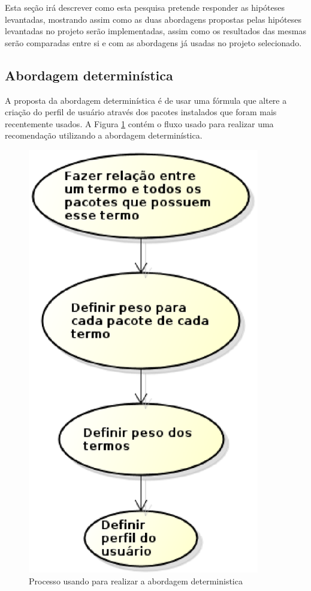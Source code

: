 Esta seção irá descrever como esta pesquisa pretende responder as hipóteses
levantadas, mostrando assim como as duas abordagens propostas pelas hipóteses
levantadas no projeto serão implementadas, assim como os resultados das mesmas
serão comparadas entre si e com as abordagens já usadas no projeto selecionado.

\subsection{Abordagem determinística}

A proposta da abordagem determinística é de usar uma fórmula que altere
a criação do perfil de usuário através dos pacotes instalados que foram mais
recentemente usados. A Figura \ref{fig:abordagem_deterministica}
contém o fluxo usado para realizar uma
recomendação utilizando a abordagem determinística.

\begin{figure}[h]
  \centering
  \includegraphics[width=0.9\textwidth]{figuras/abordagem_deterministica.eps}
  \caption{Processo usando para realizar a abordagem deterministica}
  \label{fig:abordagem_deterministica}
\end{figure}

